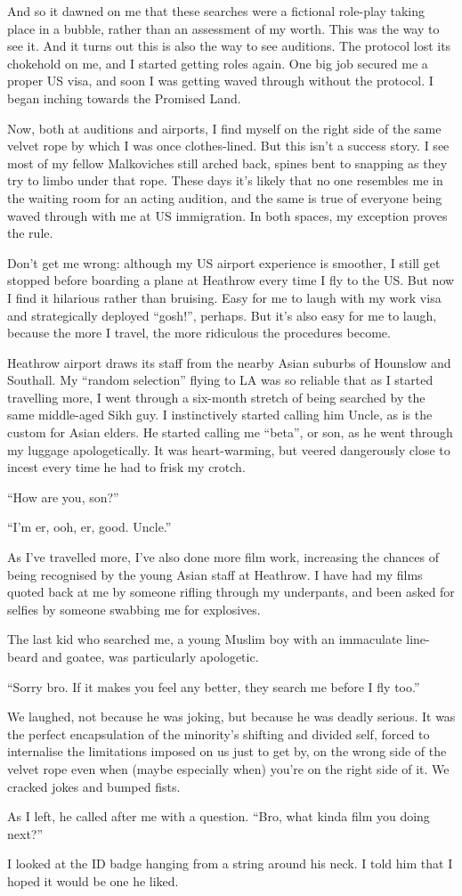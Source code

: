 \documentclass[10pt,a4paper]{article}
\begin{document}
And so it dawned on me that these searches were a fictional role-play taking place in a bubble, rather than an assessment of my worth. This was the way to see it. And it turns out this is also the way to see auditions. The protocol lost its chokehold on me, and I started getting roles again. One big job secured me a proper US visa, and soon I was getting waved through without the protocol. I began inching towards the Promised Land.

Now, both at auditions and airports, I find myself on the right side of the same velvet rope by which I was once clothes-lined. But this isn’t a success story. I see most of my fellow Malkoviches still arched back, spines bent to snapping as they try to limbo under that rope. These days it’s likely that no one resembles me in the waiting room for an acting audition, and the same is true of everyone being waved through with me at US immigration. In both spaces, my exception proves the rule.

Don’t get me wrong: although my US airport experience is smoother, I still get stopped before boarding a plane at Heathrow every time I fly to the US. But now I find it hilarious rather than bruising. Easy for me to laugh with my work visa and strategically deployed “gosh!”, perhaps. But it’s also easy for me to laugh, because the more I travel, the more ridiculous the procedures become.

Heathrow airport draws its staff from the nearby Asian suburbs of Hounslow and Southall. My “random selection” flying to LA was so reliable that as I started travelling more, I went through a six-month stretch of being searched by the same middle-aged Sikh guy. I instinctively started calling him Uncle, as is the custom for Asian elders. He started calling me “beta”, or son, as he went through my luggage apologetically. It was heart-warming, but veered dangerously close to incest every time he had to frisk my crotch.

“How are you, son?”

“I’m er, ooh, er, good. Uncle.”

As I’ve travelled more, I’ve also done more film work, increasing the chances of being recognised by the young Asian staff at Heathrow. I have had my films quoted back at me by someone rifling through my underpants, and been asked for selfies by someone swabbing me for explosives.

The last kid who searched me, a young Muslim boy with an immaculate line-beard and goatee, was particularly apologetic.

“Sorry bro. If it makes you feel any better, they search me before I fly too.”

We laughed, not because he was joking, but because he was deadly serious. It was the perfect encapsulation of the minority’s shifting and divided self, forced to internalise the limitations imposed on us just to get by, on the wrong side of the velvet rope even when (maybe especially when) you’re on the right side of it. We cracked jokes and bumped fists.

As I left, he called after me with a question. “Bro, what kinda film you doing next?”

I looked at the ID badge hanging from a string around his neck. I told him that I hoped it would be one he liked.
\end{document}
